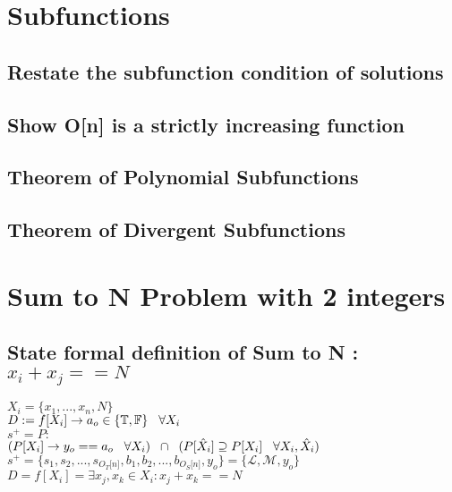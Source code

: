 \documentclass[11pt]{article}
\begin{document}
\newpage
\section{Subfunctions}

\subsection{Restate the subfunction condition of solutions}
\subsection{Show O[n] is a strictly increasing function}
\subsection{Theorem of Polynomial Subfunctions}
\subsection{Theorem of Divergent Subfunctions}






\newpage
\section{Sum to N Problem with 2 integers}
\subsection{State formal definition of Sum to N : $x_i + x_j == N$}
\begin{center}
\vspace{1.5mm}
$
X_i = \{x_1,...,x_n,N\}
$
\\ \vspace{2mm}
$
D := f \lbrack X_i \rbrack \rightarrow a_{o} \in \{\mathbb{T}, \mathbb{F}\} \hspace{3mm} \forall X_i
$
\\ \vspace{2mm}
$
s^+ = P :
$
\\ \vspace{2mm}
$
(P \lbrack X_i \rbrack \rightarrow y_{o} == a_{o} \hspace{3mm} \forall X_i) \hspace{2mm} \cap \hspace{2mm} (P[\hat{X}_i] \supseteq P[X_i] \hspace{3mm} \forall X_i,\hat{X}_i)
$
\\ \vspace{2mm}
$
s^+ = \{ s_1,s_2,...,s_{O_T \lbrack n \rbrack }, b_1, b_2,...,b_{O_S \lbrack n \rbrack},y_o \} = \{ \mathcal{L},\mathcal{M},y_o\}
$
\\ \vspace{6mm}
$
D = f[X_i] = \exists x_j,x_k \in X_i : x_j + x_k == N
$
\end{center}
\end{document}

